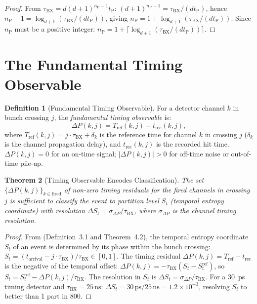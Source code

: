 \documentclass[twocolumn,10pt,a4paper]{article}
\theoremstyle{thmstyle}
\newtheorem{theorem}{Theorem}[section]
\theoremstyle{definition}
\newtheorem{definition}[theorem]{Definition}
\theoremstyle{remark}
\newcommand{\nP}{n_{\mathrm{P}}}
\newcommand{\tP}{t_{\mathrm{P}}}
\newcommand{\tBX}{\tau_{\mathrm{BX}}}
\newcommand{\DeltaP}{\Delta P}
\begin{document}
\begin{proof}
From $\tBX = d(d+1)^{\nP-1}\tP$: $(d+1)^{\nP-1} = \tBX/(d\tP)$,
hence $\nP - 1 = \log_{d+1}(\tBX/(d\tP))$, giving
$\nP = 1 + \log_{d+1}(\tBX/(d\tP))$.
Since $\nP$ must be a positive integer: $\nP = 1 + \lceil\log_{d+1}(\tBX/(d\tP))\rceil$.
\end{proof}

\section{The Fundamental Timing Observable}
\label{sec:observable}

\begin{definition}[Fundamental Timing Observable]
\label{def:timing_obs}
For a detector channel $k$ in bunch crossing $j$, the \emph{fundamental
timing observable} is:
\begin{equation}
\DeltaP(k,j) = T_{\mathrm{ref}}(k,j) - t_{\mathrm{rec}}(k,j),
\label{eq:deltaP}
\end{equation}
where $T_{\mathrm{ref}}(k,j) = j\cdot\tBX + \delta_k$ is the
reference time for channel $k$ in crossing $j$ ($\delta_k$ is the
channel propagation delay), and $t_{\mathrm{rec}}(k,j)$ is the
recorded hit time. $\DeltaP(k,j) = 0$ for an on-time signal;
$|\DeltaP(k,j)| > 0$ for off-time noise or out-of-time pile-up.
\end{definition}

\begin{theorem}[Timing Observable Encodes Classification]
\label{thm:timing_encodes}
The set $\{\DeltaP(k,j)\}_{k \in \mathrm{fired}}$ of non-zero timing
residuals for the fired channels in crossing $j$ is sufficient to classify
the event to partition level $S_t$ (temporal entropy coordinate) with
resolution $\Delta S_t = \sigma_{\DeltaP}/\tBX$, where $\sigma_{\DeltaP}$
is the channel timing resolution.
\end{theorem}

\begin{proof}
From \citet{companion:trajectory} (Definition~3.1 and Theorem~4.2),
the temporal entropy coordinate $S_t$ of an event is determined by
its phase within the bunch crossing:
$S_t = (t_{\mathrm{arrival}} - j\cdot\tBX)/\tBX \in [0,1]$.
The timing residual $\DeltaP(k,j) = T_{\mathrm{ref}} - t_{\mathrm{rec}}$
is the negative of the temporal offset:
$\DeltaP(k,j) = -\tBX(S_t - S_t^{\mathrm{ref}})$,
so $S_t = S_t^{\mathrm{ref}} - \DeltaP(k,j)/\tBX$.
The resolution in $S_t$ is $\Delta S_t = \sigma_{\DeltaP}/\tBX$.
For a 30~ps timing detector and $\tBX = 25\,\mathrm{ns}$:
$\Delta S_t = 30\,\mathrm{ps}/25\,\mathrm{ns} = 1.2\times10^{-3}$,
resolving $S_t$ to better than 1 part in 800.
\end{proof}
\end{document}
